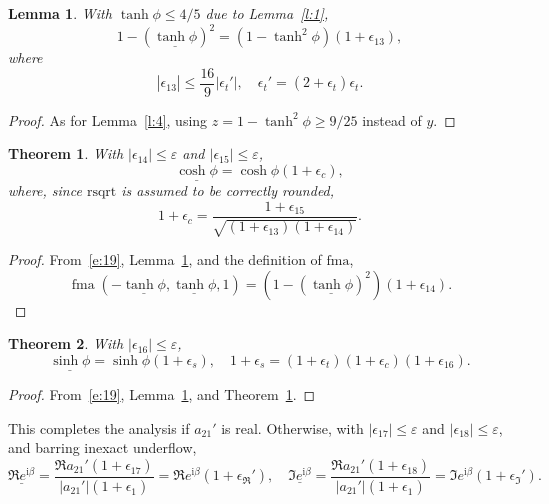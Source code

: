 \documentclass[a4paper,12pt,twoside]{article}
\newtheorem{thm}{Theorem}
\newtheorem{lem}{Lemma}
\begin{document}
\begin{lem}\label{l:8}
  With $\tanh\phi\le 4/5$ due to Lemma~\ref{l:1},
  \begin{displaymath}
    1-(\underline{\tanh\phi})^2=(1-\tanh^2\phi)(1+\epsilon_{13}),
  \end{displaymath}
  where
  \begin{equation}
    |\epsilon_{13}^{}|\le\frac{16}{9}|\epsilon_t'|,\quad
    \epsilon_t'=(2+\epsilon_t^{})\epsilon_t^{}.
    \label{e:24}
  \end{equation}
\end{lem}
\begin{proof}
  As for Lemma~\ref{l:4}, using $z=1-\tanh^2\phi\ge 9/25$ instead of
  $y$.
\end{proof}

\begin{thm}\label{t:2}
  With $|\epsilon_{14}|\le\varepsilon$ and $|\epsilon_{15}|\le\varepsilon$,
  \begin{displaymath}
    \underline{\cosh\phi}=\cosh\phi(1+\epsilon_c),
  \end{displaymath}
  where, since $\mathrm{rsqrt}$ is assumed to be correctly rounded,
  \begin{equation}
    1+\epsilon_c=\frac{1+\epsilon_{15}}{\sqrt{(1+\epsilon_{13})(1+\epsilon_{14})}}.
    \label{e:25}
  \end{equation}
\end{thm}
\begin{proof}
  From~\eqref{e:19}, Lemma~\ref{l:8}, and the definition of $\mathrm{fma}$,
  \begin{displaymath}
    \mathop{\mathrm{fma}}(-\underline{\tanh\phi},\underline{\tanh\phi},1)=(1-(\underline{\tanh\phi})^2)(1+\epsilon_{14}).
  \end{displaymath}
\end{proof}

\begin{thm}\label{t:3}
  With $|\epsilon_{16}|\le\varepsilon$,
  \begin{equation}
    \underline{\sinh\phi}=\sinh\phi(1+\epsilon_s),\quad
    1+\epsilon_s=(1+\epsilon_t)(1+\epsilon_c)(1+\epsilon_{16}).
    \label{e:26}
  \end{equation}
\end{thm}
\begin{proof}
  From~\eqref{e:19}, Lemma~\ref{l:8}, and Theorem~\ref{t:2}.
\end{proof}

This completes the analysis if $a_{21}'$ is real.  Otherwise, with
$|\epsilon_{17}|\le\varepsilon$ and $|\epsilon_{18}|\le\varepsilon$,
and barring inexact underflow,
\begin{displaymath}
  \underline{\Re{e^{\mathrm{i}\beta}}}=\frac{\Re{a_{21}'}(1+\epsilon_{17}^{})}{|a_{21}'|(1+\epsilon_1^{})}=\Re{e^{\mathrm{i}\beta}}(1+\epsilon_{\Re}'),\quad
  \underline{\Im{e^{\mathrm{i}\beta}}}=\frac{\Re{a_{21}'}(1+\epsilon_{18}^{})}{|a_{21}'|(1+\epsilon_1^{})}=\Im{e^{\mathrm{i}\beta}}(1+\epsilon_{\Im}').
\end{displaymath}
\end{document}
